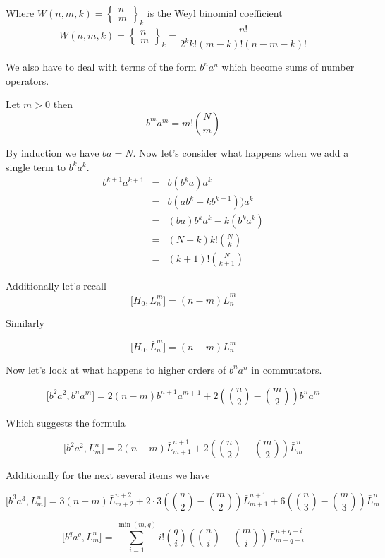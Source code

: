 \documentclass{article}
\newcommand{\lrbrack}[2]{\lbrack #1 , #2 \rbrack}
\newcommand{\wbc}[3]{\left\{\begin{array}{cc}
		{#1}\\{#2}
	\end{array} \right\}_{#3}}
\begin{document}
Where $W(n,m,k) = \wbc{n}{m}{k}$ is the Weyl binomial coefficient
\[
W(n,m,k) =\wbc{n}{m}{k} = \frac{n!}{2^k k! (m-k)!(n-m-k)!}
\]

We also have to deal with terms of the form $b^n a^n$ which become sums of number operators.

Let $m>0$ then 
\[
b^m a^m = m! {N \choose m}
\]


By induction we have $ba = N$.  Now let's consider what happens when we add a single term to $b^k a^k$.
\begin{eqnarray*}
b^{k+1}a^{k+1} &=& b(b^k a)a^{k}\\ 
&=& b(ab^{k} -kb^{k-1}) ) a^k\\
&=& (ba)b^k a^k - k(b^k a^k) \\
& = & (N-k) k!{N \choose k}\\
& = & (k+1)! {N \choose k+1}
\end{eqnarray*}


Additionally let's recall
\begin{equation}
\lrbrack{H_0}{L_n^m} = (n-m) \bar{L}_n^m
\end{equation}

Similarly

\begin{equation}
\lrbrack{H_0}{\bar{L}_n^m} = (n-m) {L}_n^m
\end{equation}


Now let's look at what happens to higher orders of $b^na^n$ in commutators.

\[
\lrbrack{b^2 a^2}{b^n a^m} = 2(n-m)b^{n+1}a^{m+1} +2({n\choose 2}-{m\choose 2})b^n a^m
\]

Which suggests the formula

\begin{equation}
\lrbrack{b^2a^2}{L_m^n} = 2(n-m) \bar{L}_{m+1}^{n+1} + 2({n\choose 2}-{m\choose 2})\bar{L}_m^n
\end{equation}


Additionally for the next several items we have

\begin{equation}
\lrbrack{b^3a^3}{L_m^n} = 3(n-m)\bar{L}_{m+2}^{n+2} + 2\cdot 3 ({n\choose 2}-{m\choose 2})\bar{L}_{m+1}^{n+1} + 6({n\choose 3}-{m\choose 3})\bar{L}_m^n
\end{equation}


\begin{equation}
\lrbrack{b^qa^q}{L_m^n} = \sum_{i=1}^{\min(m,q)} i!{q\choose i}\left({n\choose i}-{m\choose i}\right)\bar{L}_{m+q-i}^{n+q-i}
\end{equation}
\end{document}
